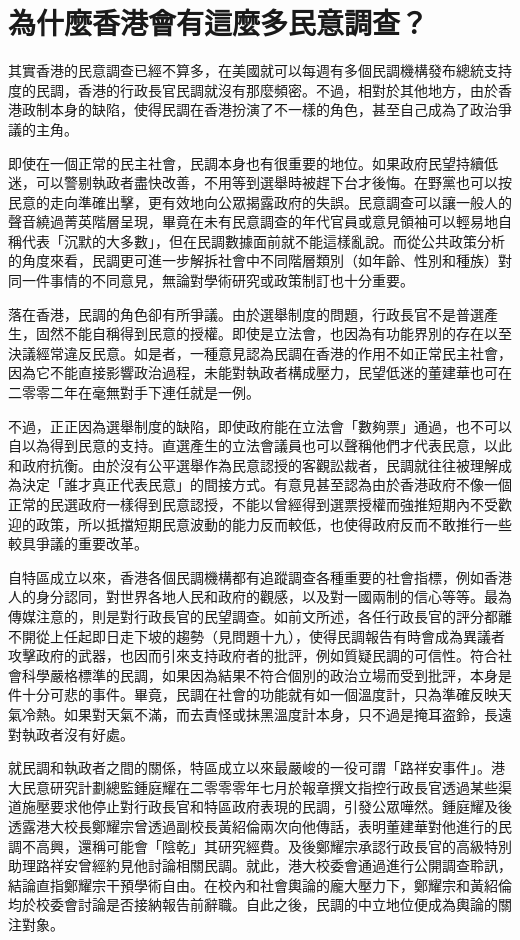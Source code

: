 \section{為什麼香港會有這麼多民意調查？}

其實香港的民意調查已經不算多，在美國就可以每週有多個民調機構發布總統支持度的民調，香港的行政長官民調就沒有那麼頻密。不過，相對於其他地方，由於香港政制本身的缺陷，使得民調在香港扮演了不一樣的角色，甚至自己成為了政治爭議的主角。

即使在一個正常的民主社會，民調本身也有很重要的地位。如果政府民望持續低迷，可以警剔執政者盡快改善，不用等到選舉時被趕下台才後悔。在野黨也可以按民意的走向準確出擊，更有效地向公眾揭露政府的失誤。民意調查可以讓一般人的聲音繞過菁英階層呈現，畢竟在未有民意調查的年代官員或意見領袖可以輕易地自稱代表「沉默的大多數」，但在民調數據面前就不能這樣亂說。而從公共政策分析的角度來看，民調更可進一步解拆社會中不同階層類別（如年齡、性別和種族）對同一件事情的不同意見，無論對學術研究或政策制訂也十分重要。

落在香港，民調的角色卻有所爭議。由於選舉制度的問題，行政長官不是普選產生，固然不能自稱得到民意的授權。即使是立法會，也因為有功能界別的存在以至決議經常違反民意。如是者，一種意見認為民調在香港的作用不如正常民主社會，因為它不能直接影響政治過程，未能對執政者構成壓力，民望低迷的董建華也可在二零零二年在毫無對手下連任就是一例。

不過，正正因為選舉制度的缺陷，即使政府能在立法會「數夠票」通過，也不可以自以為得到民意的支持。直選產生的立法會議員也可以聲稱他們才代表民意，以此和政府抗衡。由於沒有公平選舉作為民意認授的客觀訟裁者，民調就往往被理解成為決定「誰才真正代表民意」的間接方式。有意見甚至認為由於香港政府不像一個正常的民選政府一樣得到民意認授，不能以曾經得到選票授權而強推短期內不受歡迎的政策，所以抵擋短期民意波動的能力反而較低，也使得政府反而不敢推行一些較具爭議的重要改革。

自特區成立以來，香港各個民調機構都有追蹤調查各種重要的社會指標，例如香港人的身分認同，對世界各地人民和政府的觀感，以及對一國兩制的信心等等。最為傳媒注意的，則是對行政長官的民望調查。如前文所述，各任行政長官的評分都離不開從上任起即日走下坡的趨勢（見問題十九），使得民調報告有時會成為異議者攻擊政府的武器，也因而引來支持政府者的批評，例如質疑民調的可信性。符合社會科學嚴格標準的民調，如果因為結果不符合個別的政治立場而受到批評，本身是件十分可悲的事件。畢竟，民調在社會的功能就有如一個溫度計，只為準確反映天氣冷熱。如果對天氣不滿，而去責怪或抹黑溫度計本身，只不過是掩耳盗鈴，長遠對執政者沒有好處。

就民調和執政者之間的關係，特區成立以來最嚴峻的一役可謂「路祥安事件」。港大民意研究計劃總監鍾庭耀在二零零零年七月於報章撰文指控行政長官透過某些渠道施壓要求他停止對行政長官和特區政府表現的民調，引發公眾嘩然。鍾庭耀及後透露港大校長鄭耀宗曾透過副校長黃紹倫兩次向他傳話，表明董建華對他進行的民調不高興，還稱可能會「陰乾」其研究經費。及後鄭耀宗承認行政長官的高級特別助理路祥安曾經約見他討論相關民調。就此，港大校委會通過進行公開調查聆訊，結論直指鄭耀宗干預學術自由。在校內和社會輿論的龐大壓力下，鄭耀宗和黃紹倫均於校委會討論是否接納報告前辭職。自此之後，民調的中立地位便成為輿論的關注對象。

